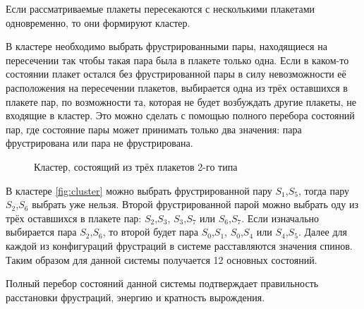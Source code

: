 \documentclass[utf8, babel, sor, jor, amsmath, amssymb, reprint]{elsarticle} %
\begin{document}
Если рассматриваемые плакеты пересекаются с несколькими плакетами одновременно, то они формируют кластер.

В кластере необходимо выбрать фрустрированными пары, находящиеся на пересечении так чтобы такая пара была в плакете только одна. Если в каком-то состоянии плакет остался без фрустрированной пары в силу невозможности её расположения на пересечении плакетов, выбирается одна из трёх оставшихся в плакете пар, по возможности та, которая не будет возбуждать другие плакеты, не входящие в кластер. Это можно сделать с помощью полного перебора состояний пар, где состояние пары может принимать только два значения: пара фрустрирована или пара не фрустрирована.

\begin{figure}[H]
	\centering
	\caption{Кластер, состоящий из трёх плакетов 2-го типа}
	\label{fig:cluster}
\end{figure}

В кластере \eqref{fig:cluster}  можно выбрать фрустрированной пару $S_1$,$S_5$, тогда пару  $S_2$,$S_6$ выбрать уже нельзя. Второй фрустрированной парой можно выбрать оду из трёх оставшихся в плакете пар: $S_2$,$S_3$, $S_3$,$S_7$ или $S_6$,$S_7$. Если изначально выбирается пара $S_2$,$S_6$, то второй будет пара $S_0$,$S_1$, $S_0$,$S_4$ или $S_4$,$S_5$. Далее для каждой из конфигураций фрустраций в системе расставляются значения спинов. Таким образом для данной системы получается 12 основных состояний. 

Полный перебор состояний данной системы подтверждает правильность расстановки фрустраций, энергию и кратность вырождения.
\end{document}
